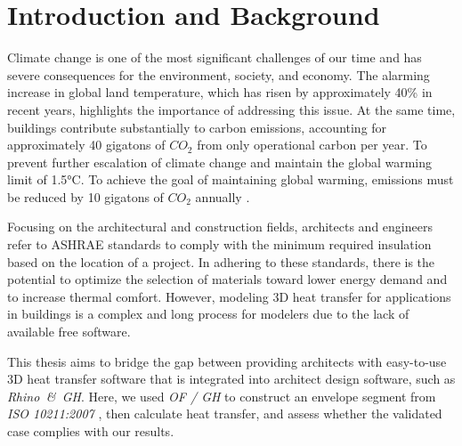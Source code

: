 \chapter{Introduction and Background}


Climate change is one of the most significant challenges of our time and has severe consequences for the environment, society, and economy. The alarming increase in global land temperature, which has risen by approximately 40\% \cite{glb} in recent years, highlights the importance of addressing this issue. At the same time, buildings contribute substantially to carbon emissions, accounting for approximately 40 gigatons of $CO_2$ from only operational carbon per year. To prevent further escalation of climate change and maintain the global warming limit of 1.5°C. To achieve the goal of maintaining global warming, emissions must be reduced by 10 gigatons of $CO_2$ annually \cite{ipcc}.

Focusing on the architectural and construction fields, architects and engineers refer to \gls{ASHRAE} standards to comply with the minimum required insulation based on the location of a project. 
In adhering to these standards, there is the potential to optimize the selection of materials toward lower energy demand and to increase thermal comfort. However, modeling 3D heat transfer for applications in buildings is a complex and long process for modelers due to the lack of available free software. 

This thesis aims to bridge the gap between providing architects with easy-to-use 3D heat transfer software that is integrated into architect design software, such as \textit{Rhino\, \&\, \gls{GH}}. Here, we used \textit{\gls{OF} / \gls{GH}} to construct an envelope segment from \textit{ISO 10211:2007}
\cite{ISO}, then calculate heat transfer, and assess whether the validated case complies with our results. 



